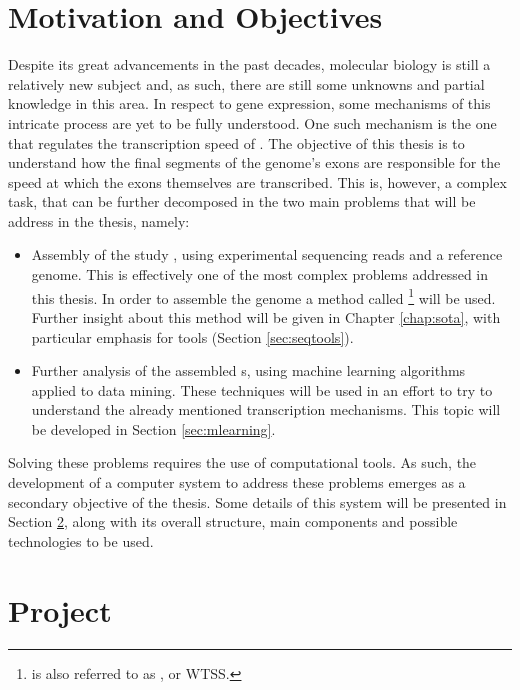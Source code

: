 \section{Motivation and Objectives} \label{sec:motivation}

Despite its great advancements in the past decades, molecular biology is still a
relatively new subject and, as such, there are still some unknowns and partial
knowledge in this area. In respect to gene expression, some mechanisms of this
intricate process are yet to be fully understood. One such mechanism is the one
that regulates the transcription speed of \rna. The objective of this thesis is
to understand how the final segments of the genome's exons are responsible for
the speed at which the exons themselves are transcribed. This is, however, a
complex task, that can be further decomposed in the two main problems that will
be address in the thesis, namely:

\begin{itemize}

  \item
  Assembly of the study \trans, using experimental sequencing reads and a
  reference genome. This is effectively one of the most complex problems
  addressed in this thesis. In order to assemble the genome a method called
  \rnaseq{}\footnote{\rnaseq{} is also referred to as , or WTSS.} will be used. Further insight about this method will be
  given in Chapter \ref{chap:sota}, with particular emphasis for \rnaseq{} tools
  (Section \ref{sec:seqtools}).

  \item
  Further analysis of the assembled \trans s, using machine learning algorithms
  applied to data mining. These techniques will be used in an effort to try to
  understand the already mentioned transcription mechanisms. This topic will be
  developed in Section \ref{sec:mlearning}.

\end{itemize}

Solving these problems requires the use of computational tools. As such, the
development of a computer system to address these problems emerges as a
secondary objective of the thesis. Some details of this system will be presented
in Section \ref{sec:project}, along with its overall structure, main components
and possible technologies to be used.

\section{Project} \label{sec:project}

